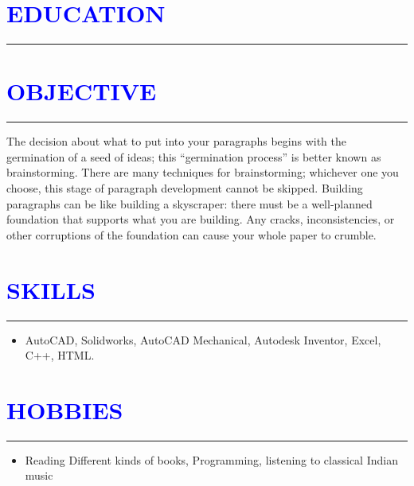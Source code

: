 \documentclass{article}
\begin{document}
\section*{\large{\textcolor{blue}{\uppercase{education}}}}
\hrule
\vspace{3pt}
 
\vspace{3pt}
\section*{\large{\textcolor{blue}{\uppercase{objective}}}}
\hrule
\vspace{3pt}
The decision about what to put into your paragraphs begins with the germination of a seed of ideas; this “germination process” is better known as brainstorming. There are many techniques for brainstorming; whichever one you choose, this stage of paragraph development cannot be skipped. Building paragraphs can be like building a skyscraper: there must be a well-planned foundation that supports what you are building. Any cracks, inconsistencies, or other corruptions of the foundation can cause your whole paper to crumble.
\vspace{3pt}

\section*{\large{\textcolor{blue}{\uppercase{Skills}}}}
\hrule
\vspace{3pt}
\begin{itemize}[noitemsep,nolistsep]
	\item AutoCAD, Solidworks, AutoCAD Mechanical, Autodesk Inventor, Excel, C++, HTML.
\end{itemize}
\vspace{3pt}

\section*{\large{\textcolor{blue}{\uppercase{Hobbies}}}}
\hrule
\vspace{3pt}
\begin{itemize}[noitemsep,nolistsep]
	\item Reading Different kinds of books, Programming, listening to classical Indian music
\end{itemize}
\end{document}
